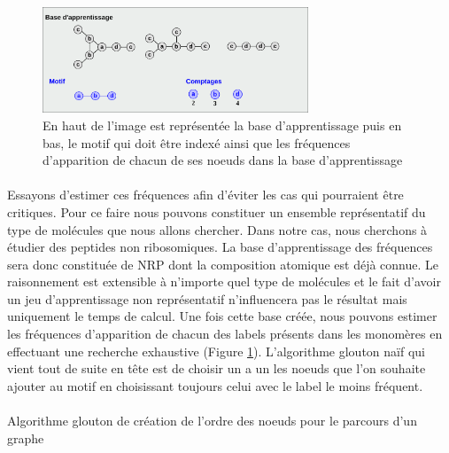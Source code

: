 \documentclass[12pt,french,twoside]{report}
\begin{document}
\begin{figure}
  \includegraphics[width=300px]{Figures/s2m/indexation/apprentissage.png}
  \caption{\label{apprentissage}En haut de l'image est représentée la base d'apprentissage puis en bas, le motif qui doit être
  indexé ainsi que les fréquences d'apparition de chacun de ses noeuds dans la base d'apprentissage}
\end{figure}

\paragraph{}Essayons d'estimer ces fréquences afin d'éviter les cas qui pourraient être critiques. Pour ce faire nous pouvons
constituer un ensemble représentatif du type de molécules que nous allons chercher.
Dans notre cas, nous cherchons à étudier des peptides non ribosomiques. La base d'apprentissage
des fréquences sera donc constituée de NRP dont la composition atomique est déjà connue. Le raisonnement est extensible à
n'importe quel type de molécules et le fait d'avoir un jeu d'apprentissage non représentatif n'influencera pas le résultat mais
uniquement le temps de calcul. Une fois cette base créée, nous pouvons estimer les fréquences d'apparition de chacun des labels
présents dans les monomères en effectuant une recherche exhaustive (Figure \ref{apprentissage}). L'algorithme glouton naïf qui
vient tout de suite en tête est de choisir un a un les noeuds que l'on souhaite ajouter au motif en choisissant toujours celui
avec le label le moins fréquent.

\paragraph{}
  \begin{algorithm}[H]
    \caption{Algorithme glouton de création de l'ordre des noeuds pour le parcours d'un graphe}
 
  \end{algorithm}
\end{document}
